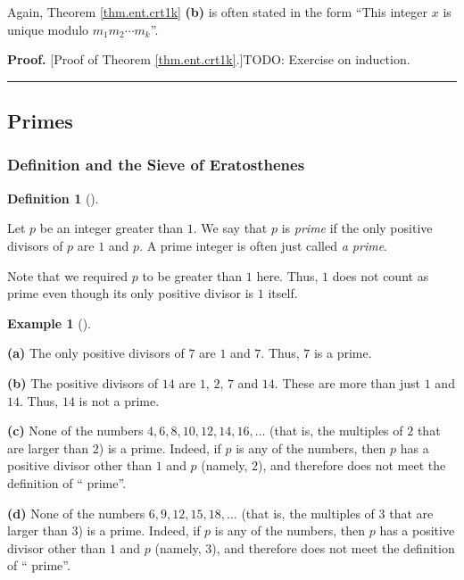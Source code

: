 \documentclass[numbers=enddot,12pt,final,onecolumn,notitlepage]{scrartcl}%
\numberwithin{exer}{subsection}
\theoremstyle{definition}
\newtheorem{defi}[theo]{Definition}
\newenvironment{definition}[1][]
{\begin{defi}[#1]\begin{leftbar}}
{\end{leftbar}\end{defi}}
\newtheorem{exam}[theo]{Example}
\newenvironment{example}[1][]
{\begin{exam}[#1]\begin{leftbar}}
{\end{leftbar}\end{exam}}
\newenvironment{proof}[1][Proof]{\noindent\textbf{#1.} }{\ \rule{0.5em}{0.5em}}
\begin{document}
Again, Theorem \ref{thm.ent.crt1k} \textbf{(b)} is often stated in the form
\textquotedblleft This integer $x$ is unique modulo $m_{1}m_{2}\cdots m_{k}%
$\textquotedblright.

\begin{proof}
[Proof of Theorem \ref{thm.ent.crt1k}.]TODO: Exercise on induction.
\end{proof}

\subsection{Primes}

\subsubsection{Definition and the Sieve of Eratosthenes}

\begin{definition}
Let $p$ be an integer greater than $1$. We say that $p$ is \textit{prime} if
the only positive divisors of $p$ are $1$ and $p$. A prime integer is often
just called \textit{a prime}.
\end{definition}

Note that we required $p$ to be greater than $1$ here. Thus, $1$ does not
count as prime even though its only positive divisor is $1$ itself.

\begin{example}
\label{exa.ent.primes.1}\textbf{(a)} The only positive divisors of $7$ are $1$
and $7$. Thus, $7$ is a prime.

\textbf{(b)} The positive divisors of $14$ are $1$, $2$, $7$ and $14$. These
are more than just $1$ and $14$. Thus, $14$ is not a prime.

\textbf{(c)} None of the numbers $4,6,8,10,12,14,16,\ldots$ (that is, the
multiples of $2$ that are larger than $2$) is a prime. Indeed, if $p$ is any
of the numbers, then $p$ has a positive divisor other than $1$ and $p$
(namely, $2$), and therefore does not meet the definition of \textquotedblleft
prime\textquotedblright.

\textbf{(d)} None of the numbers $6,9,12,15,18,\ldots$ (that is, the multiples
of $3$ that are larger than $3$) is a prime. Indeed, if $p$ is any of the
numbers, then $p$ has a positive divisor other than $1$ and $p$ (namely, $3$),
and therefore does not meet the definition of \textquotedblleft
prime\textquotedblright.
\end{example}
\end{document}
